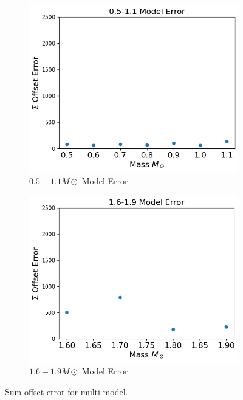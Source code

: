 \begin{figure}[H]
	\begin{subfigure}{\textwidth}
		\centering
		\includegraphics[width=\textwidth,height=0.5\textheight]{assets/0.5-1.1Error.png}
		\caption{$0.5-1.1M\odot$ Model Error.}
		\label{fig:sumerrormultia}
	\end{subfigure}
	\begin{subfigure}{\textwidth}
		\centering
		\includegraphics[width=\textwidth,height=0.5\textheight]{assets/1.6-1.9error.png}
		\caption{$1.6-1.9M\odot$ Model Error.}
		\label{fig:sumerrormultib}
	\end{subfigure}
	\caption{Sum offset error for multi model.}
	\label{fig:sumerrormulti}
\end{figure}

